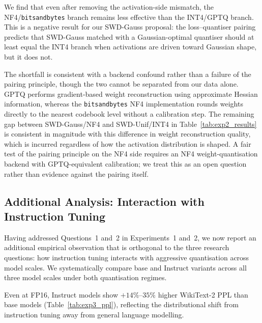 \documentclass[11pt,a4paper]{article}
\begin{document}
We find that even after removing the activation-side mismatch, the NF4/\texttt{bitsandbytes} branch remains less effective than the INT4/GPTQ branch. This is a negative result for our SWD-Gauss proposal: the loss--quantiser pairing predicts that SWD-Gauss matched with a Gaussian-optimal quantiser should at least equal the INT4 branch when activations are driven toward Gaussian shape, but it does not.

The shortfall is consistent with a backend confound rather than a failure of the pairing principle, though the two cannot be separated from our data alone. GPTQ performs gradient-based weight reconstruction using approximate Hessian information, whereas the \texttt{bitsandbytes} NF4 implementation rounds weights directly to the nearest codebook level without a calibration step. The remaining gap between SWD-Gauss/NF4 and SWD-Unif/INT4 in Table~\ref{tab:exp2_results} is consistent in magnitude with this difference in weight reconstruction quality, which is incurred regardless of how the activation distribution is shaped. A fair test of the pairing principle on the NF4 side requires an NF4 weight-quantisation backend with GPTQ-equivalent calibration; we treat this as an open question rather than evidence against the pairing itself.
 
 
\subsection{Additional Analysis: Interaction with Instruction Tuning}
\label{sec:exp3}

Having addressed Questions~1 and~2 in Experiments~1 and~2, we now report an additional empirical observation that is orthogonal to the three research questions: how instruction tuning interacts with aggressive quantisation across model scales. We systematically compare base and Instruct variants across all three model scales under both quantisation regimes.
 
Even at FP16, Instruct models show $+14\%$--$35\%$ higher WikiText-2 PPL than base models (Table~\ref{tab:exp3_ppl}), reflecting the distributional shift from instruction tuning away from general language modelling.
 
\end{document}
